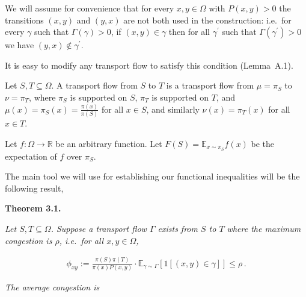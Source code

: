 We will assume for convenience that for every $x,y\in\Omega$ with $P(x,y)>0$ the transitions $(x,y)$ and $(y,x)$ are not both used in the construction: i.e. for every $\gamma$ such that $\Gamma(\gamma)>0$, if $(x,y)\in\gamma$ then for all $\gamma^{\prime}$ such that $\Gamma(\gamma^{\prime})>0$ we have $(y,x)\notin\gamma^{\prime}$.\par




It is easy to modify any transport flow to satisfy this condition (Lemma A.1).\par




Let $S,T\subseteq\Omega$. A transport flow from $S$ to $T$ is a transport flow from $\mu=\pi_{S}$ to $\nu=\pi_{T}$, where $\pi_{S}$ is supported on $S$, $\pi_{T}$ is supported on $T$, and $\mu(x)=\pi_{S}(x)=\frac{\pi(x)}{\pi(S)}$ for all $x\in S$, and similarly $\nu(x)=\pi_{T}(x)$ for all $x\in T$.\par




Let $f:\Omega\rightarrow\mathbb{R}$ be an arbitrary function. Let $F(S)=\mathbb{E}_{x\sim\pi_{S}}f(x)$ be the expectation of $f$ over $\pi_{S}$.\par




The main tool we will use for establishing our functional inequalities will be the following result,\par





\par\medskip\noindent\textbf{\textbf{Theorem 3.1}\textbf{.}}\par



\emph{Let $S,T\subseteq\Omega$. Suppose a transport flow $\Gamma$ exists from $S$ to $T$ where the maximum congestion is $\rho$, i.e. for all $x,y\in\Omega$,}\par




\[\begin{gathered}
\phi_{xy}:=\frac{\pi(S)\pi(T)}{\pi(x)P(x,y)}\cdot\mathbb{E}_{\gamma\sim\Gamma}\left[1[(x,y)\in\gamma]\right]\leq\rho\,.
\end{gathered}\]




\emph{The average congestion is}\par




